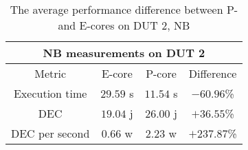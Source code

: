 
\begin{table}[H]
    \centering
    \begin{tabular}{|| c | c | c | c ||}
    \hline
    \multicolumn{4}{||c||}{NB measurements on DUT 2} \\ [0.5ex] \hline\hline
    Metric & E-core & P-core & Difference \\\hline
    Execution time & $29.59$ s & $11.54$ s & $-60.96$\% \\
    DEC & $19.04$ j & $26.00$ j & $+36.55$\% \\
    DEC per second & $0.66$ w & $2.23$ w & $+237.87$\% \\\hline
    \end{tabular}
    \caption{The average performance difference between P- and E-cores on DUT 2, NB}
    \label{tab:dut-2-exp-3-nb}
\end{table}










